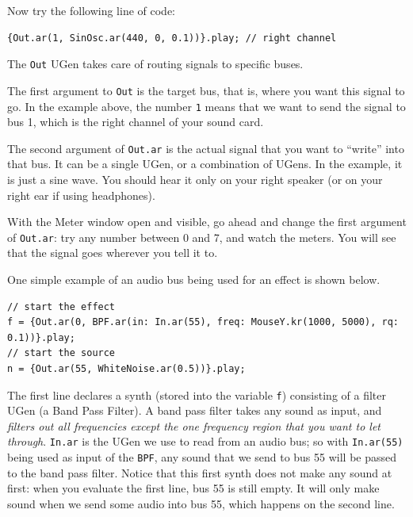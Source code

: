 Now try the following line of code:

\begin{lstlisting}[style=SuperCollider-IDE, basicstyle=\scttfamily\footnotesize]
{Out.ar(1, SinOsc.ar(440, 0, 0.1))}.play; // right channel
\end{lstlisting}

The \texttt{Out} UGen takes care of routing signals to specific buses.

The first argument to \texttt{Out} is the target bus, that is, where you want this signal to go.  In the example above, the number \texttt{1} means that we want to send the signal to bus 1, which is the right channel of your sound card.

The second argument of \texttt{Out.ar} is the actual signal that you want to ``write'' into that bus. It can be a single UGen, or a combination of UGens. In the example, it is just a sine wave. You should hear it only on your right speaker (or on your right ear if using headphones).

With the Meter window open and visible, go ahead and change the first argument of \texttt{Out.ar}: try any number between 0 and 7, and watch the meters. You will see that the signal goes wherever you tell it to.

\bigskip
{}
\bigskip

One simple example of an audio bus being used for an effect is shown below.

\begin{lstlisting}[style=SuperCollider-IDE, basicstyle=\scttfamily\footnotesize]
// start the effect
f = {Out.ar(0, BPF.ar(in: In.ar(55), freq: MouseY.kr(1000, 5000), rq: 0.1))}.play;
// start the source
n = {Out.ar(55, WhiteNoise.ar(0.5))}.play;
\end{lstlisting}

The first line declares a synth (stored into the variable \texttt{f}) consisting of a filter UGen (a Band Pass Filter). A band pass filter takes any sound as input, and \emph{filters out all frequencies except the one frequency region that you want to let through}. \texttt{In.ar} is the UGen we use to read from an audio bus; so with \texttt{In.ar(55)} being used as input of the \texttt{BPF}, any sound that we send to bus 55 will be passed to the band pass filter. Notice that this first synth does not make any sound at first: when you evaluate the first line, bus 55 is still empty. It will only make sound when we send some audio into bus 55, which happens on the second line. 

